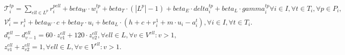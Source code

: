 \begin{align}
  &  & & \mathcal{T}_{i}^{t p} = \sum_{\mathit{ell} \in L^{p}} r_{i}^{p \mathit{ell}} + \mathit{beta}_{W} \cdot w_{i}^{t p} + \mathit{beta}_{T} \cdot \left(\left|\right. L^{p} \left|\right. - 1\right) + \mathit{beta}_{E} \cdot \mathit{delta}_{i}^{t p} + \mathit{beta}_{L} \cdot \mathit{gamma}_{i}^{t p} \forall i \in I , \forall t \in T_{i} , \forall p \in P_{i} ,  \tag{eq\_0034} \\
  &  & & \mathcal{V}_{i}^{t} = r_{i}^{1} + \mathit{beta}_{W} \cdot c + \mathit{beta}_{T} \cdot u_{i} + \mathit{beta}_{L} \cdot \left(h + c + r_{i}^{1} + m \cdot u_{i} - a_{i}^{t}\right) , \forall i \in I , \forall t \in T_{i} .  \tag{eq\_0035} \\
  &  & & d_{v}^{\mathit{ell}} - d_{v - 1}^{\mathit{ell}} = 60 \cdot z_{v 1}^{\mathit{ell}} + 120 \cdot z_{v 2}^{\mathit{ell}} , \forall \mathit{ell} \in L , \forall v \in V^{\mathit{ell}} : v > 1 ,  \tag{eq\_0036} \\
  &  & & z_{v 1}^{\mathit{ell}} + z_{v 2}^{\mathit{ell}} = 1 , \forall \mathit{ell} \in L , \forall v \in V^{\mathit{ell}} : v > 1 .  \tag{eq\_0037} \\
\end{align}
